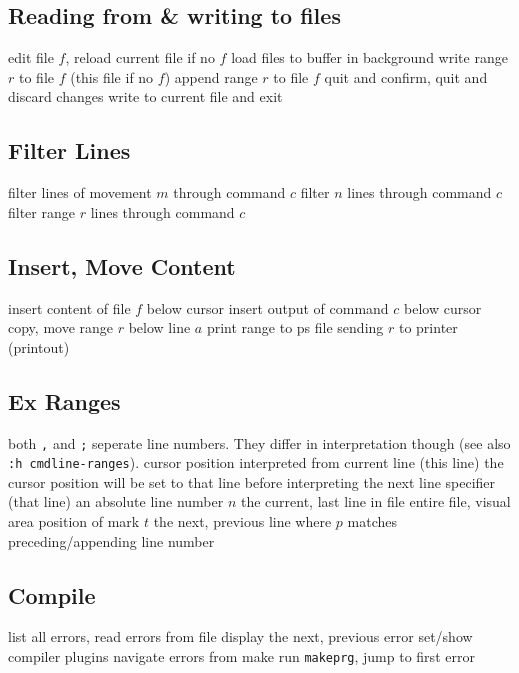 \subsection{Reading from \& writing to files}	{}
	{edit file $f$, reload current file if no $f$}
	{load files to buffer in background}
	{write range $r$ to file $f$ (this file if no $f$)}
	{append range $r$ to file $f$}
	{quit and confirm, quit and discard changes}
	{write to current file and exit}

\subsection{Filter Lines}{}
	{filter lines of movement $m$ through command $c$}
	{filter $n$ lines through command $c$}
	{filter range $r$ lines through command $c$}

\subsection{Insert, Move Content}	{}
	{insert content of file $f$ below cursor}
	{insert output of command $c$ below cursor}
	{copy, move range $r$ below line $a$}
	{print range to ps file}
	{sending $r$ to printer (printout)}

\subsection{Ex Ranges}	{both {\tt ,} and {\tt ;} seperate line numbers. They differ in interpretation though (see also {\tt :h cmdline-ranges}).}
\cmdOper{, }	{cursor position interpreted from current line (this line)}
\cmdOper{;\ }	{the cursor position will be set to that line before interpreting the next line specifier (that line)}
	{an absolute line number $n$}
	{the current, last line in file}
\cmdOper{\% * }	{entire file, visual area}
	{position of mark $t$}
	{the next, previous line where $p$ matches}
	{preceding/appending line number}

\subsection{Compile}	{}
	{list all errors, read errors from file}
	{display the next, previous error}
	{set/show compiler plugins}
	{navigate errors from make}
	{run {\tt makeprg}, jump to first error}

